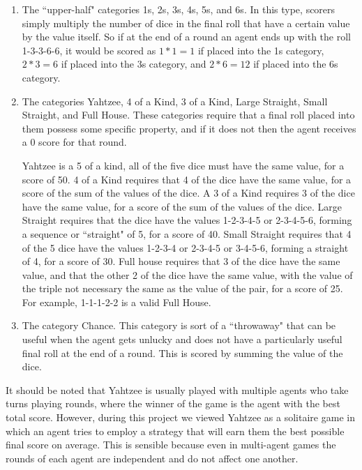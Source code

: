 \documentclass{article}
\begin{document}
\begin{enumerate}

\item{}
The ``upper-half" categories 1s, 2s, 3s, 4s, 5s, and 6s. In this type, scorers
simply multiply
the number of dice in the final roll 
that have a certain value
by the value itself. So if at the end of a round an agent ends up with the roll
1-3-3-6-6, it would be scored as $1*1=1$ if placed into the 1s category,
$2*3=6$ if
placed into the 3s category, and $2*6=12$ if placed into the 6s category.\\

\item{}
The categories Yahtzee, 4 of a Kind, 3 of a Kind, Large Straight, Small
Straight, and Full House. These categories require that a final roll placed into
them possess some specific property, and if it does not then the agent receives
a 0 score for that round.

Yahtzee is a 5 of a kind, all of the five dice must have
the same value, for a score of 50. 4 of a Kind requires that 4 of the dice
have the same value, for a score of the sum of the values of the dice. A 3 of a
Kind requires 3 of the dice have the same value, for a score of the sum of the
values of the dice. Large Straight requires that the dice have the values
1-2-3-4-5
or 2-3-4-5-6, forming a sequence or ``straight" of 5, for a score of 40. Small
Straight requires that 4 of the 5 dice have the values 1-2-3-4 or 2-3-4-5 or
3-4-5-6, forming a straight of 4, for a score of 30. Full house requires that 3
of the dice have the same value, and that the other 2 of the dice have the same
value, with the value of the triple not necessary the same as the value of the
pair, for a score of 25. For example, 1-1-1-2-2 is a valid Full House.

\item{}
The category Chance. This category is sort of a ``throwaway" that can be useful
when the agent gets unlucky and does not have a particularly useful final roll
at the end of a round. This is scored by summing the value of the dice.

\end{enumerate}

It should be noted that Yahtzee is usually played with multiple agents who take
turns playing rounds, where the winner of the game is the agent with the best
total score. However, during this project we viewed Yahtzee as a solitaire game
in which an agent tries to employ a strategy that will earn them the best
possible final score on average. This is sensible because even in multi-agent
games the rounds of each agent are independent and do not affect one another.
\\
\end{document}
